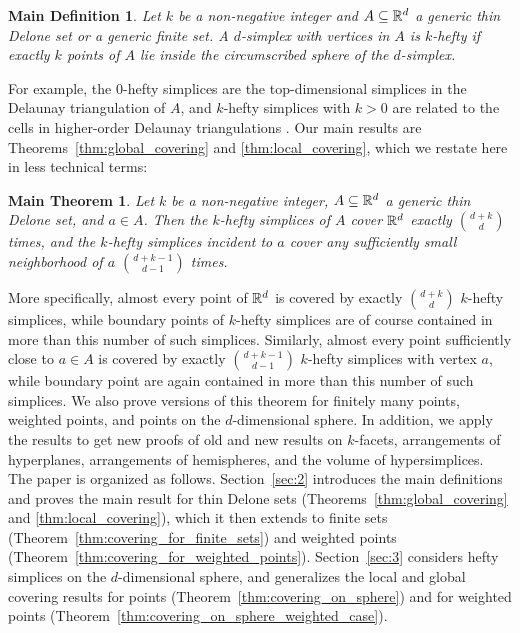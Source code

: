 \documentclass[10pt,a4paper]{article}
\newcommand {\mm}[1] {\ifmmode{#1}\else{\mbox{\(#1\)}}\fi}
\theoremstyle{plain}
\newtheorem*{supermaintheorem*}{Main Theorem}
\newtheorem*{supermaindefinition*}{Main Definition}
\newcommand{\Rspace}        {\mm{{\mathbb R}}}
\begin{document}
\begin{supermaindefinition*}
  \label{dfn:hefty_simplex}
  Let $k$ be a non-negative integer and $A \subseteq \Rspace^d$ a generic thin Delone set or a generic finite set. 
  A $d$-simplex with vertices in $A$ is \emph{$k$-hefty} if exactly $k$ points of $A$ lie inside the circumscribed sphere of the $d$-simplex.
\end{supermaindefinition*}
For example, the $0$-hefty simplices are the top-dimensional simplices in the Delaunay triangulation of $A$,
and $k$-hefty simplices with $k > 0$ are related to the cells in higher-order Delaunay triangulations \cite{Aur90,EdOs21}.
Our main results are Theorems~\ref{thm:global_covering} and \ref{thm:local_covering}, which we restate here in less technical terms:
\begin{supermaintheorem*}
  Let $k$ be a non-negative integer, $A \subseteq \Rspace^d$ a generic thin Delone set, and $a \in A$.
  Then the $k$-hefty simplices of $A$ cover $\Rspace^d$ exactly $\binom{d+k}{d}$ times, and the $k$-hefty simplices incident to $a$ cover any sufficiently small neighborhood of $a$ $\binom{d+k-1}{d-1}$ times.
\end{supermaintheorem*}
More specifically, almost every point of $\Rspace^d$ is covered by exactly $\binom{d+k}{d}$ $k$-hefty simplices, while boundary points of $k$-hefty simplices are of course contained in more than this number of such simplices.
Similarly, almost every point sufficiently close to $a \in A$ is covered by exactly $\binom{d+k-1}{d-1}$ $k$-hefty simplices with vertex $a$, while boundary point are again contained in more than this number of such simplices.
We also prove versions of this theorem for finitely many points, weighted points, and points on the $d$-dimensional sphere.
In addition, we apply the results to get new proofs of old and new results on $k$-facets, arrangements of hyperplanes, arrangements of hemispheres, and the volume of hypersimplices.
\smallskip
The paper is organized as follows.
Section~\ref{sec:2} introduces the main definitions and proves the main result for thin Delone sets (Theorems~\ref{thm:global_covering} and \ref{thm:local_covering}), which it then extends to finite sets (Theorem~\ref{thm:covering_for_finite_sets}) and weighted points (Theorem~\ref{thm:covering_for_weighted_points}).
%
Section~\ref{sec:3} considers hefty simplices on the $d$-dimensional sphere, and generalizes the local and global covering results for points (Theorem~\ref{thm:covering_on_sphere})
and for weighted points (Theorem~\ref{thm:covering_on_sphere_weighted_case}).
\end{document}
